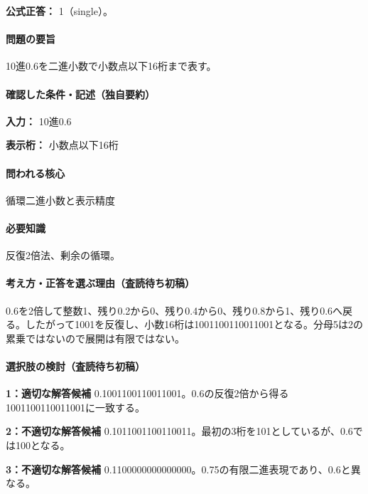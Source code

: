 \textbf{公式正答：} 1（single）。

\paragraph{問題の要旨} 10進0.6を二進小数で小数点以下16桁まで表す。

\paragraph{確認した条件・記述（独自要約）}\mbox{}\par

\noindent\textbf{入力：} 10進0.6\par

\noindent\textbf{表示桁：} 小数点以下16桁\par

\paragraph{問われる核心} 循環二進小数と表示精度

\paragraph{必要知識} 反復2倍法、剰余の循環。

\paragraph{考え方・正答を選ぶ理由（査読待ち初稿）} 0.6を2倍して整数1、残り0.2から0、残り0.4から0、残り0.8から1、残り0.6へ戻る。したがって1001を反復し、小数16桁は1001100110011001となる。分母5は2の累乗ではないので展開は有限ではない。

\paragraph{選択肢の検討（査読待ち初稿）}\mbox{}\par

\noindent\textbf{1：適切な解答候補} 0.1001100110011001。0.6の反復2倍から得る1001100110011001に一致する。\par

\noindent\textbf{2：不適切な解答候補} 0.1011001100110011。最初の3桁を101としているが、0.6では100となる。\par

\noindent\textbf{3：不適切な解答候補} 0.1100000000000000。0.75の有限二進表現であり、0.6と異なる。\par

